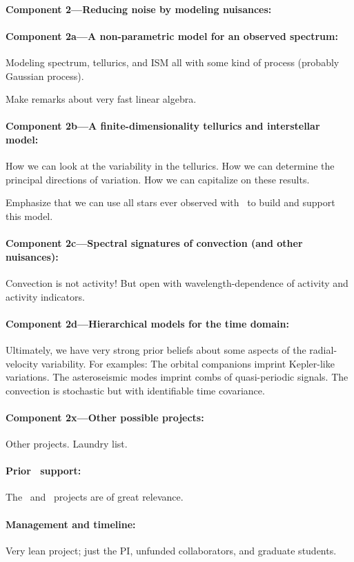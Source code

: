 \documentclass[12pt, fullpage, letterpaper]{article}
\begin{document}
\paragraph{Component 2---Reducing noise by modeling nuisances:}

\paragraph{Component 2a---A non-parametric model for an observed spectrum:}
Modeling spectrum, tellurics, and ISM all with some kind of
process (probably Gaussian process).

Make remarks about very fast linear algebra.

\paragraph{Component 2b---A finite-dimensionality tellurics and interstellar model:}
How we can look at the variability in the tellurics.
How we can determine the principal directions of variation.
How we can capitalize on these results.

Emphasize that we can use all stars ever observed with \HARPS\ to
build and support this model.

\paragraph{Component 2c---Spectral signatures of convection (and other nuisances):}
Convection is not activity! But open with wavelength-dependence of
activity and activity indicators.

\paragraph{Component 2d---Hierarchical models for the time domain:}
Ultimately, we have very strong prior beliefs about some aspects
of the radial-velocity variability. For examples: The orbital
companions imprint Kepler-like variations. The asteroseismic modes
imprint combs of quasi-periodic signals. The convection is stochastic
but with identifiable time covariance.

\paragraph{Component 2x---Other possible projects:}
Other projects. Laundry list.

\paragraph{Prior \NASA\ support:}
The \GALEX\ and \Ktwo\ projects are of great relevance.

\paragraph{Management and timeline:}
Very lean project; just the PI, unfunded collaborators, and graduate students.
\end{document}
